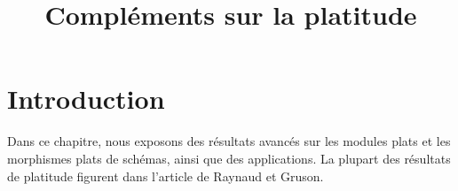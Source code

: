 

%


\title{Compléments sur la platitude}

\maketitle

\label{section-phantom}

\tableofcontents



\section{Introduction}
\label{section-introduction}

\noindent
Dans ce chapitre, nous exposons des résultats avancés sur les modules plats et les
morphismes plats de schémas, ainsi que des applications. La plupart des résultats de platitude
figurent dans l'article \cite{GruRay} de Raynaud et Gruson.

